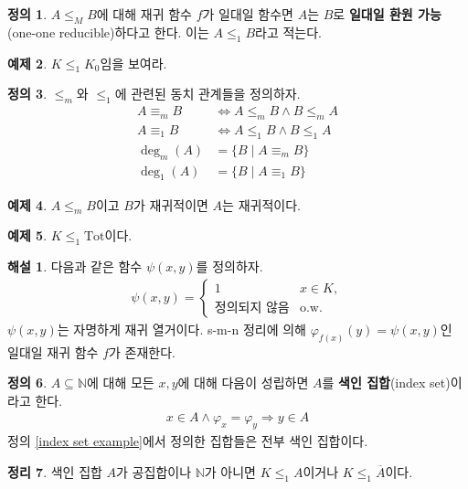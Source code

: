 \documentclass[b5paper, 11pt]{book}
\theoremstyle{definition}
\newtheorem{defn}{정의}[chapter]
\newtheorem{thm}[defn]{정리}
\newtheorem{ex}[defn]{예제}
\newtheorem*{ans*}{해설}
\begin{document}
\begin{defn}
    $A \le_M B$에 대해 재귀 함수 $f$가 일대일 함수면 $A$는 $B$로 \textbf{일대일 환원 가능}(one-one reducible)하다고 한다. 이는 $A \le_1 B$라고 적는다.
\end{defn}
\begin{ex}
    $K \le_1 K_0$임을 보여라.
\end{ex}
\begin{defn}
    $\le_m$와 $\le_1$에 관련된 동치 관계들을 정의하자.
    \begin{align*}
        A \equiv_m B &\Leftrightarrow A \le_m B \wedge B \le_m A \\ 
        A \equiv_1 B &\Leftrightarrow A \le_1 B \wedge B \le_1 A \\ 
        \deg_m (A) &= \{ B \;\vert\; A \equiv_m B\} \\ 
        \deg_1 (A) &= \{ B \;\vert\; A \equiv_1 B\} 
    \end{align*}
\end{defn}
\begin{ex}
    $A \le_m B$이고 $B$가 재귀적이면 $A$는 재귀적이다.
\end{ex}
\begin{ex}
    $K \le_1 \mathrm{Tot}$이다.
\end{ex}
\begin{ans*}
    다음과 같은 함수 $\psi(x,y)$를 정의하자.
    \begin{align*}
        \psi(x, y) = 
        \begin{cases}
            1 & x \in K, \\
            \text{정의되지 않음}    &   \text{o.w.}
        \end{cases}
    \end{align*}
    $\psi(x,y)$는 자명하게 재귀 열거이다. s-m-n 정리에 의해 $\varphi_{f(x)} (y) = \psi (x, y)$인 일대일 재귀 함수 $f$가 존재한다. 
\end{ans*}
\begin{defn}
    $A \subseteq \mathbb{N}$에 대해 모든 $x, y$에 대해 다음이 성립하면 $A$를 \textbf{색인 집합}(index set)이라고 한다.
    \begin{align*}
        x \in A \wedge \varphi_x = \varphi_y \Rightarrow y \in A
    \end{align*}
    정의 \ref{index set example}에서 정의한 집합들은 전부 색인 집합이다.
\end{defn}
\begin{thm}
    색인 집합 $A$가 공집합이나 $\mathbb{N}$가 아니면 $K \le_1 A$이거나 $K \le_1 \overline{A}$이다.
\end{thm}
\end{document}
